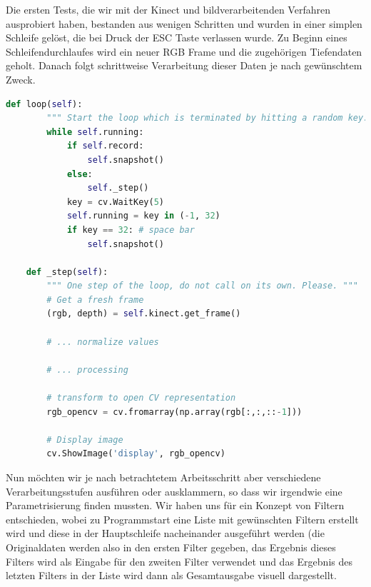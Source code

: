 \documentclass[12pt,a4paper,ngerman]{scrartcl}
\begin{document}
Die ersten Tests, die wir mit der Kinect und bildverarbeitenden Verfahren
ausprobiert haben, bestanden aus wenigen Schritten und wurden in einer
simplen Schleife gelöst, die bei Druck der ESC Taste verlassen wurde. Zu Beginn
eines Schleifendurchlaufes wird ein neuer RGB Frame und die zugehörigen
Tiefendaten geholt. Danach folgt schrittweise Verarbeitung dieser Daten je nach
gewünschtem Zweck.


\begin{lstlisting}[language=Python, caption={Jeder Schleifendurchlauf entspricht einem Frame. Mit der SPACE Taste wird der aktuelle Frame als Bild gespeichert, jede andere Taste beendet die Schleife und somit das Programm.}]
    def loop(self):
        """ Start the loop which is terminated by hitting a random key. """
        while self.running:
            if self.record:
                self.snapshot()
            else:
                self._step()
            key = cv.WaitKey(5)
            self.running = key in (-1, 32)
            if key == 32: # space bar
                self.snapshot()

    def _step(self):
        """ One step of the loop, do not call on its own. Please. """
        # Get a fresh frame
        (rgb, depth) = self.kinect.get_frame()

        # ... normalize values

        # ... processing

        # transform to open CV representation
        rgb_opencv = cv.fromarray(np.array(rgb[:,:,::-1]))

        # Display image
        cv.ShowImage('display', rgb_opencv)

\end{lstlisting}



Nun möchten wir je nach betrachtetem Arbeitsschritt aber verschiedene
Verarbeitungsstufen ausführen oder ausklammern, so dass wir irgendwie eine
Parametrisierung finden mussten. Wir haben uns für ein Konzept von Filtern
entschieden, wobei zu Programmstart eine Liste mit gewünschten Filtern erstellt
wird und diese in der Hauptschleife nacheinander ausgeführt werden (die Originaldaten
werden also in den ersten Filter gegeben, das Ergebnis dieses Filters wird als
Eingabe für den zweiten Filter verwendet und das Ergebnis des letzten Filters
in der Liste wird dann als Gesamtausgabe visuell dargestellt.
\end{document}
